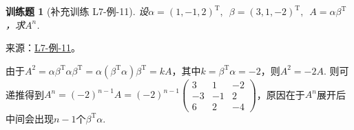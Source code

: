 \documentclass[UTF8,12pt,a4paper,fontset=fandol]{ctexart}
\newtheorem{exercise}{训练题}[section]
\begin{document}
\begin{exercise}[补充训练 L7-例-11]\label{prob:L7-例-11}
设$\alpha=(1,-1,2)^\mathrm{T},\enspace\beta=(3,1,-2)^\mathrm{T},\enspace A=\alpha\beta^\mathrm{T}$，求$A^n$.
\end{exercise}
\noindent 来源：\href{https://github.com/yhwu-is/Linear-Algebra-Left-Undone/blob/new/%E8%AE%B2%E4%B9%89/%E4%B8%93%E9%A2%98/7%20%E7%BA%BF%E6%80%A7%E6%98%A0%E5%B0%84%E7%9F%A9%E9%98%B5%E8%A1%A8%E7%A4%BA%E4%B8%8E%E7%9F%A9%E9%98%B5%E8%BF%90%E7%AE%97%E5%9F%BA%E7%A1%80.tex}{L7-例-11}。
\begin{solve}
由于$A^2=\alpha\beta^\mathrm{T}\alpha\beta^\mathrm{T}=\alpha(\beta^\mathrm{T}\alpha)\beta^\mathrm{T}=kA$，其中$k=\beta^\mathrm{T}\alpha=-2$，则$A^2=-2A$. 则可递推得到$A^n=(-2)^{n-1}A=(-2)^{n-1}\begin{pmatrix}
            3 & 1 & -2 \\ -3 & -1 & 2 \\ 6 & 2 & -4
        \end{pmatrix}$，原因在于$A^n$展开后中间会出现$n-1$个$\beta^\mathrm{T}\alpha$.
\end{solve}
\end{document}
